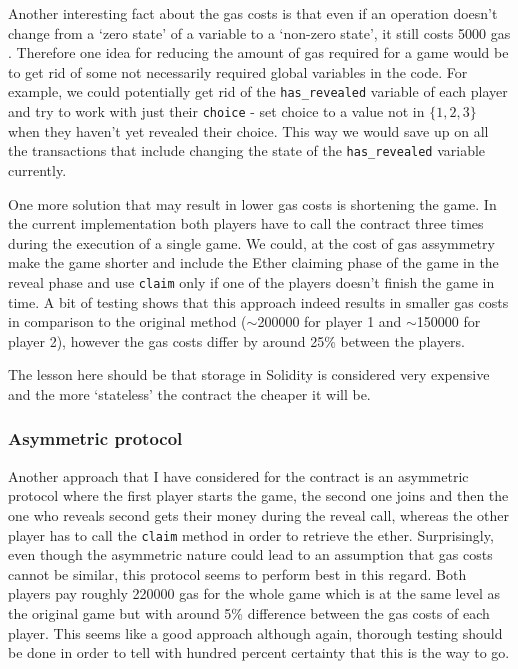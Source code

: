 \documentclass{article}
\begin{document}
    \noindent Another interesting fact about the gas costs
    is that even if an operation doesn't change from a `zero
    state' of a variable to a `non-zero state', it still
    costs 5000 gas \cite{ypaper}. Therefore one idea for
    reducing the amount of gas required for a game would be
    to get rid of some not necessarily required global
    variables in the code. For example, we could potentially
    get rid of the \verb|has_revealed| variable of each
    player and try to work with just their \verb|choice| -
    set choice to a value not in \(\{1,2,3\}\) when they
    haven't yet revealed their choice. This way we would
    save up on all the transactions that include changing
    the state of the \verb|has_revealed| variable currently.
    \newline

    \noindent One more solution that may result in lower gas
    costs is shortening the game. In the current
    implementation both players have to call the contract
    three times during the execution of a single game. We
    could, at the cost of gas assymmetry make the game
    shorter and include the Ether claiming phase of the game
    in the reveal phase and use \verb|claim| only if one of
    the players doesn't finish the game in time. A bit of
    testing shows that this approach indeed results in
    smaller gas costs in comparison to the original method
    (\(\sim\)200000 for player 1 and \(\sim\)150000 for
    player 2), however the gas costs differ by around 25\%
    between the players.
    \newline

    \noindent The lesson here should be that storage in
    Solidity is considered very expensive and the more
    `stateless' the contract the cheaper it will be.

    \subsubsection{Asymmetric protocol}
    Another approach that I have considered for the contract
    is an asymmetric protocol where the first player starts
    the game, the second one joins and then the one who
    reveals second gets their money during the reveal call,
    whereas the other player has to call the \verb|claim|
    method in order to retrieve the ether. Surprisingly,
    even though the asymmetric nature could lead to an
    assumption that gas costs cannot be similar, this
    protocol seems to perform best in this regard. Both
    players pay roughly 220000 gas for the whole game which
    is at the same level as the original game but with
    around 5\% difference between the gas costs of each
    player. This seems like a good approach although again,
    thorough testing should be done in order to tell with
    hundred percent certainty that this is the way to go.
\end{document}
